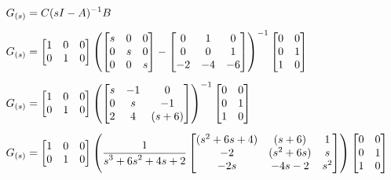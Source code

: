 \documentclass[../main.tex]{subfiles}
\begin{document}
                \begin{equation}
                    \begin{split}
                        G_{(s)} &= C(sI - A)^{-1}B\\[5pt]
                        G_{(s)} &= \begin{bmatrix} 1 & 0 & 0 \\ 0 & 1 & 0 \end{bmatrix} \left( \begin{bmatrix} s & 0 & 0 \\ 0 & s & 0 \\ 0 & 0 & s \end{bmatrix} - \begin{bmatrix} 0 & 1 & 0 \\ 0 & 0 & 1 \\ -2 & -4 & -6 \end{bmatrix} \right)^{-1} \begin{bmatrix} 0 & 0 \\ 0 & 1 \\ 1 & 0 \end{bmatrix} \\[5pt]
                        G_{(s)} &= \begin{bmatrix} 1 & 0 & 0 \\ 0 & 1 & 0 \end{bmatrix} \left( \begin{bmatrix} s & -1 & 0 \\ 0 & s & -1 \\ 2 & 4 & (s+6)\end{bmatrix} \right)^{-1} \begin{bmatrix} 0 & 0 \\ 0 & 1 \\ 1 & 0 \end{bmatrix} \\[5pt]
                            G_{(s)} &= \begin{bmatrix} 1 & 0 & 0 \\ 0 & 1 & 0 \end{bmatrix} \left( \ffrac{1}{s^3 + 6s^2 + 4s + 2} \begin{bmatrix} (s^2 + 6s + 4) & (s + 6) & 1 \\ -2 & (s^2+6s) & s \\ -2s & -4s-2 & s^2 \end{bmatrix} \right) \begin{bmatrix} 0 & 0 \\ 0 & 1 \\ 1 & 0 \end{bmatrix}\\[5pt]

\end{split}
\end{equation}
\end{document}

